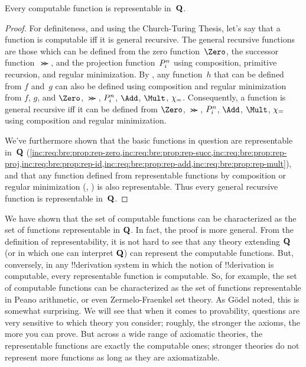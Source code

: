\documentclass[../../../include/open-logic-section]{subfiles}
\begin{document}

\begin{thm}
Every computable function is representable in~$\mathbf{Q}$.
\end{thm}

\begin{proof}
For definiteness, and using the Church-Turing Thesis, let's say that a
function is computable iff it is general recursive. The general
recursive functions are those which can be defined from the zero
function~$\Zero$, the successor function~$\Succ$, and the projection
function~$P^{n}_{i}$ using composition, primitive recursion, and
regular minimization. By , any function~$h$
that can be defined from $f$ and~$g$ can also be defined using
composition and regular minimization from $f$, $g$, and $\Zero$,
$\Succ$, $P^{n}_{i}$, $\Add$, $\Mult$, $\chi_{=}$. Consequently, a
function is general recursive iff it can be defined from $\Zero$,
$\Succ$, $P^{n}_{i}$, $\Add$, $\Mult$, $\chi_{=}$ using composition
and regular minimization.

We've furthermore shown that the basic functions in question are
representable in~$\mathbf{Q}$
(\cref{inc:req:bre:prop:rep-zero,inc:req:bre:prop:rep-succ,inc:req:bre:prop:rep-proj,inc:req:bre:prop:rep-id,inc:req:bre:prop:rep-add,inc:req:bre:prop:rep-mult}),
and that any function defined from representable functions by
composition or regular minimization
(,
) is also representable. Thus every
general recursive function is representable in~$\mathbf{Q}$.
\end{proof}

\begin{explain}
We have shown that the set of computable functions can be
characterized as the set of functions representable in $\mathbf{Q}$. In
fact, the proof is more general. From the definition of
representability, it is not hard to see that any theory extending
$\mathbf{Q}$ (or in which one can interpret $\mathbf{Q}$) can represent the
computable functions. But, conversely, in any !!{derivation} system in
which the notion of !!{derivation} is computable, every representable
function is computable. So, for example, the set of computable
functions can be characterized as the set of functions representable
in Peano arithmetic, or even Zermelo-Fraenkel set theory. As G\"odel
noted, this is somewhat surprising.  We will see that when it comes to
provability, questions are very sensitive to which theory you
consider; roughly, the stronger the axioms, the more you can prove.
But across a wide range of axiomatic theories, the representable
functions are exactly the computable ones; stronger theories do not
represent more functions as long as they are axiomatizable.
\end{explain}
\end{document}
